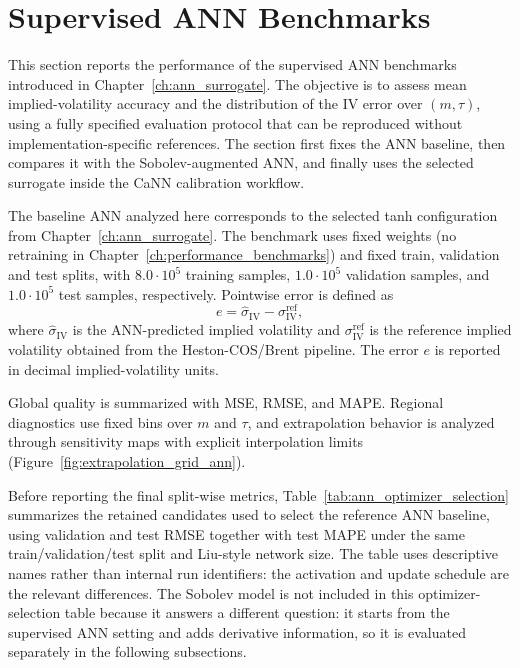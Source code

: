\section{Supervised ANN Benchmarks}
\label{sec:ann_pricer_performance}
This section reports the performance of the supervised ANN benchmarks introduced in Chapter~\ref{ch:ann_surrogate}. The objective is to assess mean implied-volatility accuracy and the distribution of the IV error over \((m,\tau)\), using a fully specified evaluation protocol that can be reproduced without implementation-specific references. The section first fixes the ANN baseline, then compares it with the Sobolev-augmented ANN, and finally uses the selected surrogate inside the CaNN calibration workflow.

The baseline ANN analyzed here corresponds to the selected tanh configuration from Chapter~\ref{ch:ann_surrogate}. The benchmark uses fixed weights (no retraining in Chapter~\ref{ch:performance_benchmarks}) and fixed train, validation and test splits, with \(8.0\cdot10^5\) training samples, \(1.0\cdot10^5\) validation samples, and \(1.0\cdot10^5\) test samples, respectively. Pointwise error is defined as
\[
e=\hat{\sigma}_{\mathrm{IV}}-\sigma_{\mathrm{IV}}^{\mathrm{ref}},
\]
where \(\hat{\sigma}_{\mathrm{IV}}\) is the ANN-predicted implied volatility and \(\sigma_{\mathrm{IV}}^{\mathrm{ref}}\) is the reference implied volatility obtained from the Heston-COS/Brent pipeline. The error \(e\) is reported in decimal implied-volatility units.

Global quality is summarized with MSE, RMSE, and MAPE. Regional diagnostics use fixed bins over \(m\) and \(\tau\), and extrapolation behavior is analyzed through sensitivity maps with explicit interpolation limits (Figure~\ref{fig:extrapolation_grid_ann}).

Before reporting the final split-wise metrics, Table~\ref{tab:ann_optimizer_selection} summarizes the retained candidates used to select the reference ANN baseline, using validation and test RMSE together with test MAPE under the same train/validation/test split and Liu-style network size. The table uses descriptive names rather than internal run identifiers: the activation and update schedule are the relevant differences. The Sobolev model is not included in this optimizer-selection table because it answers a different question: it starts from the supervised ANN setting and adds derivative information, so it is evaluated separately in the following subsections.

